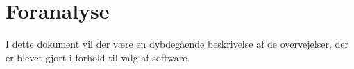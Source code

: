 \chapter{Foranalyse}
I dette dokument vil der være en dybdegående beskrivelse af de overvejelser, der er blevet gjort i forhold til valg af software. \\


